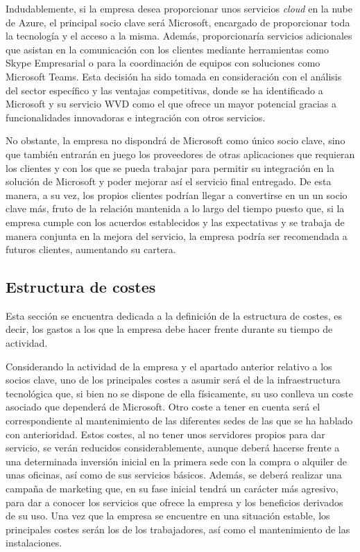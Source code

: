 Indudablemente, si la empresa desea proporcionar unos servicios \textit{cloud} en la nube de Azure, el principal socio clave será Microsoft, encargado de proporcionar toda la tecnología y el acceso a la misma. Además, proporcionaría servicios adicionales que asistan en la comunicación con los clientes mediante herramientas como Skype Empresarial o para la coordinación de equipos con soluciones como Microsoft Teams. Esta decisión ha sido tomada en consideración con el análisis del sector específico y las ventajas competitivas, donde se ha identificado a Microsoft y su servicio \acs{WVD} como el que ofrece un mayor potencial gracias a funcionalidades innovadoras e integración con otros servicios.

No obstante, la empresa no dispondrá de Microsoft como único socio clave, sino que también entrarán en juego los proveedores de otras aplicaciones que requieran los clientes y con los que se pueda trabajar para permitir su integración en la solución de Microsoft y poder mejorar así el servicio final entregado. De esta manera, a su vez, los propios clientes podrían llegar a convertirse en un un socio clave más, fruto de la relación mantenida a lo largo del tiempo puesto que, si la empresa cumple con los acuerdos establecidos y las expectativas y se trabaja de manera conjunta en la mejora del servicio, la empresa podría ser recomendada a futuros clientes, aumentando su cartera.

\subsection{Estructura de costes}
Esta sección se encuentra dedicada a la definición de la estructura de costes, es decir, los gastos a los que la empresa debe hacer frente durante su tiempo de actividad.

Considerando la actividad de la empresa y el apartado anterior relativo a los socios clave, uno de los principales costes a asumir será el de la infraestructura tecnológica que, si bien no se dispone de ella físicamente, su uso conlleva un coste asociado que dependerá de Microsoft. Otro coste a tener en cuenta será el correspondiente al mantenimiento de las diferentes sedes de las que se ha hablado con anterioridad. Estos costes, al no tener unos servidores propios para dar servicio, se verán reducidos considerablemente, aunque deberá hacerse frente a una determinada inversión inicial en la primera sede con la compra o alquiler de unas oficinas, así como de sus servicios básicos. Además, se deberá realizar una campaña de marketing que, en su fase inicial tendrá un carácter más agresivo, para dar a conocer los servicios que ofrece la empresa y los beneficios derivados de su uso. Una vez que la empresa se encuentre en una situación estable, los principales costes serán los de los trabajadores, así como el mantenimiento de las instalaciones.

